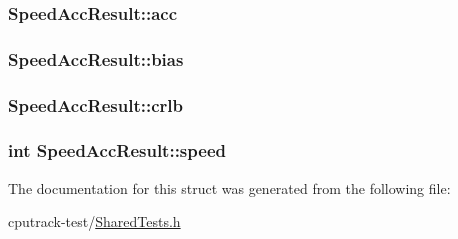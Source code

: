 \subsubsection[{\texorpdfstring{acc}{acc}}]{ Speed\+Acc\+Result\+::acc}\hypertarget{struct_speed_acc_result_a3126444f87be7af1cfa4e8667d2074ca}{}\label{struct_speed_acc_result_a3126444f87be7af1cfa4e8667d2074ca}
\subsubsection[{\texorpdfstring{bias}{bias}}]{ Speed\+Acc\+Result\+::bias}\hypertarget{struct_speed_acc_result_a5a85287067db300e2205507b8c67cd5a}{}\label{struct_speed_acc_result_a5a85287067db300e2205507b8c67cd5a}
\subsubsection[{\texorpdfstring{crlb}{crlb}}]{ Speed\+Acc\+Result\+::crlb}\hypertarget{struct_speed_acc_result_aec7bafb1d6f5fa5022115857bbca5094}{}\label{struct_speed_acc_result_aec7bafb1d6f5fa5022115857bbca5094}
\subsubsection[{\texorpdfstring{speed}{speed}}]{\setlength{\rightskip}{0pt plus 5cm}int Speed\+Acc\+Result\+::speed}\hypertarget{struct_speed_acc_result_acff2d93f39aef032dfb530636ca78463}{}\label{struct_speed_acc_result_acff2d93f39aef032dfb530636ca78463}


The documentation for this struct was generated from the following file\+:\begin{DoxyCompactItemize}
\item 
cputrack-\/test/\hyperlink{_shared_tests_8h}{Shared\+Tests.\+h}\end{DoxyCompactItemize}
